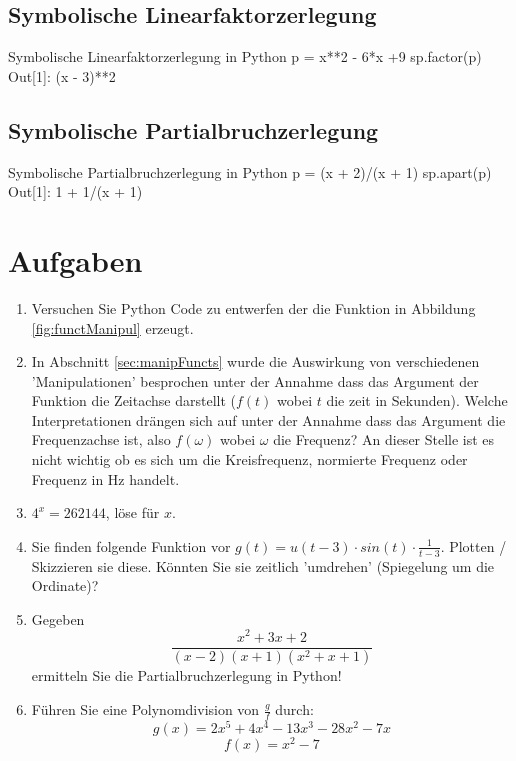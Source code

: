 


\subsection{Symbolische Linearfaktorzerlegung}
\begin{python}{Symbolische Linearfaktorzerlegung in Python}
p = x**2 - 6*x +9
sp.factor(p)
Out[1]: (x - 3)**2
\end{python}


\subsection{Symbolische Partialbruchzerlegung}

\begin{python}{Symbolische Partialbruchzerlegung in Python}
p = (x + 2)/(x + 1)
sp.apart(p)
Out[1]: 1 + 1/(x + 1)
\end{python}




\section{Aufgaben}
\begin{enumerate}
\item Versuchen Sie Python Code zu entwerfen der die Funktion in Abbildung \ref{fig:functManipul} erzeugt.
\item In Abschnitt \ref{sec:manipFuncts} wurde die Auswirkung von verschiedenen 'Manipulationen' besprochen unter der Annahme dass das Argument der Funktion die Zeitachse darstellt ($f(t)$ wobei $t$ die zeit in Sekunden). Welche Interpretationen drängen sich auf unter der Annahme dass das Argument die Frequenzachse ist, also $f(\omega)$ wobei $\omega$ die Frequenz? An dieser Stelle ist es nicht wichtig ob es sich um die Kreisfrequenz, normierte Frequenz oder Frequenz in Hz handelt.

\item $4^x = 262144$, löse für $x$.

\item Sie finden folgende Funktion vor $g(t) = u(t-3) \cdot sin(t) \cdot \frac{1}{t-3}$. Plotten / Skizzieren sie diese. Könnten Sie sie zeitlich 'umdrehen' (Spiegelung um die Ordinate)?

\item Gegeben $$ \frac{x^{2} + 3 x + 2}{\left(x - 2\right) \left(x + 1\right) \left(x^{2} + x + 1\right)}$$ ermitteln Sie die Partialbruchzerlegung in Python!

\item Führen Sie eine Polynomdivision von $\frac{g}{f}$ durch:
$$g(x) = 2 x^{5} + 4 x^{4} - 13 x^{3} - 28 x^{2} - 7 x $$
$$f(x) = x^2-7 $$

\end{enumerate}
